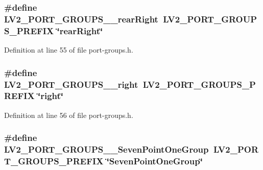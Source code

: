 \subsubsection[{\texorpdfstring{L\+V2\+\_\+\+P\+O\+R\+T\+\_\+\+G\+R\+O\+U\+P\+S\+\_\+\+\_\+rear\+Right}{LV2_PORT_GROUPS__rearRight}}]{\setlength{\rightskip}{0pt plus 5cm}\#define L\+V2\+\_\+\+P\+O\+R\+T\+\_\+\+G\+R\+O\+U\+P\+S\+\_\+\+\_\+rear\+Right~{\bf L\+V2\+\_\+\+P\+O\+R\+T\+\_\+\+G\+R\+O\+U\+P\+S\+\_\+\+P\+R\+E\+F\+IX} \char`\"{}rear\+Right\char`\"{}}\hypertarget{port-groups_8h_a52ff6e0b727d74f77be9c01f80c60622}{}\label{port-groups_8h_a52ff6e0b727d74f77be9c01f80c60622}


Definition at line 55 of file port-\/groups.\+h.

\subsubsection[{\texorpdfstring{L\+V2\+\_\+\+P\+O\+R\+T\+\_\+\+G\+R\+O\+U\+P\+S\+\_\+\+\_\+right}{LV2_PORT_GROUPS__right}}]{\setlength{\rightskip}{0pt plus 5cm}\#define L\+V2\+\_\+\+P\+O\+R\+T\+\_\+\+G\+R\+O\+U\+P\+S\+\_\+\+\_\+right~{\bf L\+V2\+\_\+\+P\+O\+R\+T\+\_\+\+G\+R\+O\+U\+P\+S\+\_\+\+P\+R\+E\+F\+IX} \char`\"{}right\char`\"{}}\hypertarget{port-groups_8h_a888bccf9667e819b409642ddc21a1d3a}{}\label{port-groups_8h_a888bccf9667e819b409642ddc21a1d3a}


Definition at line 56 of file port-\/groups.\+h.

\subsubsection[{\texorpdfstring{L\+V2\+\_\+\+P\+O\+R\+T\+\_\+\+G\+R\+O\+U\+P\+S\+\_\+\+\_\+\+Seven\+Point\+One\+Group}{LV2_PORT_GROUPS__SevenPointOneGroup}}]{\setlength{\rightskip}{0pt plus 5cm}\#define L\+V2\+\_\+\+P\+O\+R\+T\+\_\+\+G\+R\+O\+U\+P\+S\+\_\+\+\_\+\+Seven\+Point\+One\+Group~{\bf L\+V2\+\_\+\+P\+O\+R\+T\+\_\+\+G\+R\+O\+U\+P\+S\+\_\+\+P\+R\+E\+F\+IX} \char`\"{}Seven\+Point\+One\+Group\char`\"{}}\hypertarget{port-groups_8h_ae59b0f18ca286de7ec4e3170b0d6a824}{}\label{port-groups_8h_ae59b0f18ca286de7ec4e3170b0d6a824}


